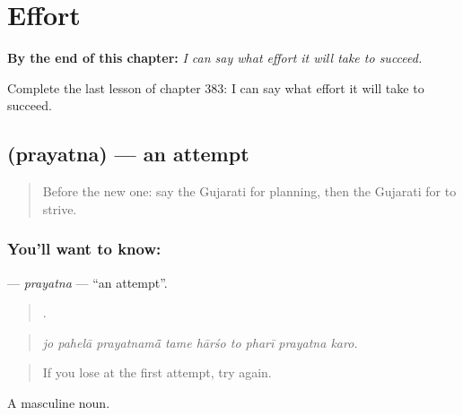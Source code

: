 
\chapter{Effort}
\label{ch:gu-effort}

\begin{chapteropening}
\textbf{By the end of this chapter:} \emph{I can say what effort it will take to succeed.}

Complete the last lesson of chapter 383: I can say what effort it will take to succeed.
\end{chapteropening}

\section[\texorpdfstring{\gu{પ્રયત્ન} (prayatna)}{પ્રયત્ન (prayatna)}]{ (prayatna) — an attempt}

\label{lesson:GU-C383-prayatna}



\begin{quote}
Before the new one: say the Gujarati for planning, then the Gujarati for to strive.
\end{quote}

\subsection*{You'll want to know: }
\textbf{} — \emph{prayatna} — \textquotedblleft{}an attempt\textquotedblright{}.

\begin{quote}
        .
\end{quote}

\begin{quote}
\emph{jo pahelā prayatnamā̃ tame hārśo to pharī prayatna karo.}
\end{quote}

\begin{quote}
If you lose at the first attempt, try again.
\end{quote}

A masculine noun.

